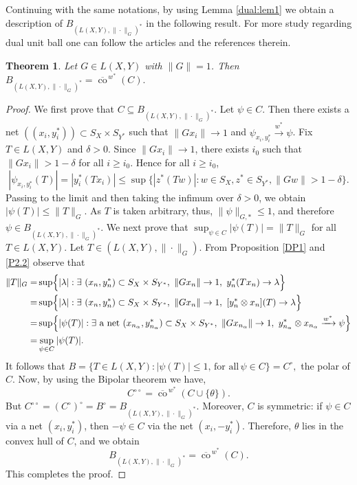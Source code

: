 \documentclass[12pt]{amsart}
\newtheorem{theorem}{Theorem}[section]
\theoremstyle{definition}
\numberwithin{equation}{section}
\begin{document}
    Continuing with the same notations, by using Lemma \ref{dual:lem1} we obtain a description of $B_{( L(X, Y), \|\cdot\|_G)^*}$ in the following result. For more study regarding dual unit ball one can follow the articles \cite{Godefroy, Spear, Kadets2, Generatingoperator} and the references therein.
    
	\begin{theorem}\label{Th1}
		Let $G\in L(X, Y)$ with $\|G\| = 1$. Then $B_{( L(X, Y), \|\cdot\|_G)^*} = \overline{\operatorname{co}}^{\,w^*}(C).$
	\end{theorem}
	
	
	\begin{proof}
		We first prove that $C\subseteq B_{(L(X, Y),\|\cdot\|_G)^*}$. Let $\psi\in C$. Then there exists a net $((x_i,y_i^*))\subset S_X\times S_{Y^*}$ such that $\|Gx_i\|\to1$ and $\psi_{x_i,y_i^*}\xrightarrow{w^*}\psi$. Fix $T\in L(X, Y )$ and $\delta>0$. Since $\|Gx_i\|\to1$, there exists $i_0$ such that $\|Gx_i\|>1-\delta$ for all $i\ge i_0$. Hence for all $i\ge i_0$,
		\[
		|\psi_{x_i,y_i^*}(T)|=|y_i^*(Tx_i)|\le\sup\bigl\{|z^*(Tw)|: w\in S_X, z^*\in S_{Y^*}, \|Gw\|>1-\delta\bigr\}.
		\]
		Passing to the limit and then taking the infimum over $\delta>0$, we obtain $|\psi(T)|\le \|T\|_G$. As $T$ is taken arbitrary, thus,  $\|\psi\|_{G,*}\le1$, and therefore $\psi\in B_{(L(X, Y),\|\cdot\|_G)^*}$. We next prove that $\sup_{\psi\in C}|\psi(T)|=\|T\|_G$ for all $T\in L(X, Y)$. Let $T\in (L(X, Y),\|\cdot\|_G)$. From Proposition \ref{DP1} and \ref{P2.2} observe that 
        \begin{align*}
        \|T\|_G=&\sup \Bigl\{ |\lambda| :\exists\ (x_n,y_n^*) \subset S_X \times S_{Y^*},\ \|Gx_n\|\to 1,\ y_n^*(Tx_n)\to \lambda \Bigr\} \\
        = &\sup \Bigl\{ |\lambda| :\exists\ (x_n,y_n^*) \subset S_X \times S_{Y^*},\ \|Gx_n\|\to 1,\ [y_n^* \otimes x_n](T)\to \lambda \Bigr\} \\
        = &\sup \Bigl\{ |\psi(T)| : \exists\ \text{a net}\ (x_{n_\alpha}, y_{n_\alpha}^*) \subset S_X \times S_{Y^*},\ \|Gx_{n_\alpha}\|\to 1,\ y_{n_\alpha}^* \otimes x_{n_\alpha} \xrightarrow{w^*} \psi\Bigr\} \\
        = &\sup_{\psi \in C} |\psi(T)|.
        \end{align*}
        It follows that $B = \{ T \in  L(X, Y) : |\psi(T)| \leq 1,\,\text{for all}\, \psi \in C \} = C^\circ,$ the polar of $C$. Now, by using the Bipolar theorem we have,
		\[
		C^{\circ \circ} = \overline{\operatorname{co}}^{\,w^*}(C \cup \{\theta\}).
		\]  
		But $ C^{\circ \circ} = (C^\circ)^\circ = B^\circ = B_{(L(X, Y),\|\cdot\|_G)^*} $. Moreover, $ C $ is symmetric: if $ \psi \in C $ via a net $ (x_i, y_i^*) $, then $ -\psi \in C $ via the net $ (x_i, -y_i^*) $. Therefore, $\theta$ lies in the convex hull of $ C $, and we obtain  
		\[
		B_{(L(X, Y),\|\cdot\|_G)^*} = \overline{\operatorname{co}}^{\,w^*}(C).
		\]
		This completes the proof.
	\end{proof}
	
\end{document}
